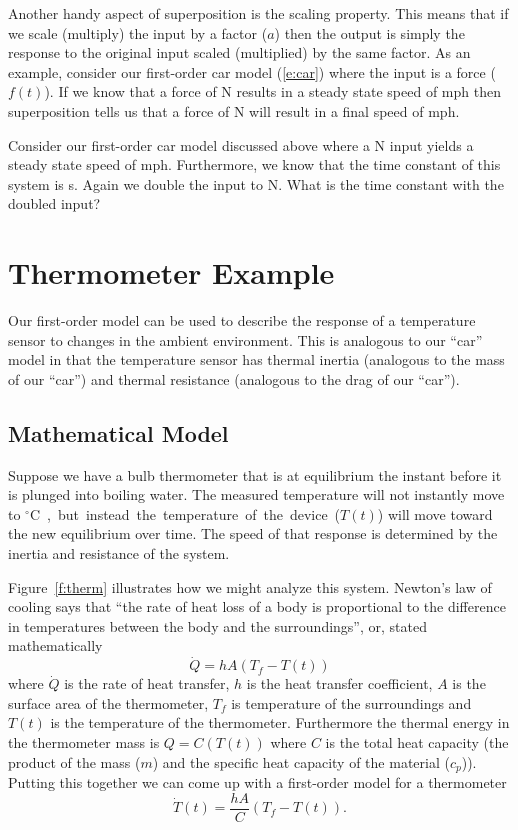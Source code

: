 Another handy aspect of superposition is the scaling property.  This means that if we scale (multiply) the input by a factor ($a$) then the output is simply the response to the original input scaled (multiplied) by the same factor.  As an example, consider our first-order car model (\ref{e:car}) where the input is a force ($f(t)$).  If we know that a force of \unit[1,000]{N} results in a steady state speed of \unit[25]{mph} then superposition tells us that a force of \unit[2,000]{N} will result in a final speed of \unit[50]{mph}.

\begin{ex}
Consider our first-order car model discussed above where a \unit[1,000]{N} input yields a steady state speed of \unit[25]{mph}.  Furthermore, we know that the time constant of this system is \unit[2]{s}.  Again we double the input to \unit[2,000]{N}. What is the time constant with the doubled input?
\end{ex}

\section{Thermometer Example}
Our first-order model can be used to describe the response of a temperature sensor to changes in the ambient environment.  This is analogous to our ``car'' model in that the temperature sensor has thermal inertia (analogous to the mass of our ``car'') and thermal resistance (analogous to the drag of our ``car'').  

\subsection{Mathematical Model}
Suppose we have a bulb thermometer that is at equilibrium the instant before it is plunged into boiling water.  The measured temperature will not instantly move to \unit[100]{$^{\circ}$C}, but instead the temperature of the device ($T(t)$) will move toward the new equilibrium over time.  The speed of that response is determined by the inertia and resistance of the system.

Figure~\ref{f:therm} illustrates how we might analyze this system.  Newton's law of cooling says that ``the rate of heat loss of a body is proportional to the difference in temperatures between the body and the surroundings'', or, stated mathematically 
\begin{equation}
\dot{Q}=hA (T_f-T(t))
\end{equation}
where $\dot{Q}$ is the rate of heat transfer, $h$ is the heat transfer coefficient, $A$ is the surface area of the thermometer, $T_f$ is temperature of the surroundings and $T(t)$ is the temperature of the thermometer.  Furthermore the thermal energy in the thermometer mass is $Q=C(T(t))$ where $C$ is the total heat capacity (the product of the mass ($m$) and the specific heat capacity of the material ($c_p$)).  Putting this together we can come up with a first-order model for a thermometer
\begin{equation}
\label{e:therm}
\dot{T}(t)= \frac{hA}{C}(T_f-T(t)).
\end{equation}

